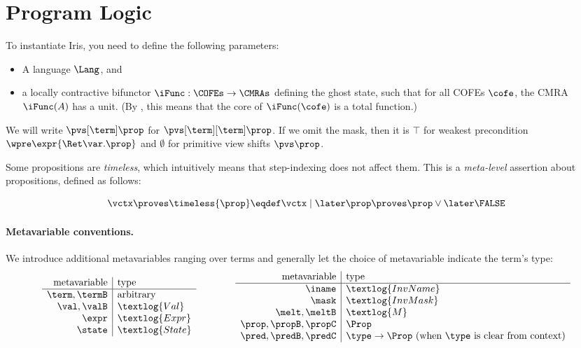 \clearpage
\section{Program Logic}


To instantiate Iris, you need to define the following parameters:
\begin{itemize}
\item A language $\Lang$, and
\item a locally contractive bifunctor $\iFunc : \COFEs \to \CMRAs$ defining the ghost state, such that for all COFEs $\cofe$, the CMRA $\iFunc(A)$ has a unit. (By , this means that the core of $\iFunc(\cofe)$ is a total function.)
\end{itemize}

We will write $\pvs[\term] \prop$ for $\pvs[\term][\term] \prop$.
If we omit the mask, then it is $\top$ for weakest precondition $\wpre\expr{\Ret\var.\prop}$ and $\emptyset$ for primitive view shifts $\pvs \prop$.

Some propositions are \emph{timeless}, which intuitively means that step-indexing does not affect them.
This is a \emph{meta-level} assertion about propositions, defined as follows:

\[ \vctx \proves \timeless{\prop} \eqdef \vctx\mid\later\prop \proves \prop \lor \later\FALSE \]

\paragraph{Metavariable conventions.}
We introduce additional metavariables ranging over terms and generally let the choice of metavariable indicate the term's type:
\[
\begin{array}{r|l}
 \text{metavariable} & \text{type} \\\hline
  \term, \termB & \text{arbitrary} \\
  \val, \valB & \textlog{Val} \\
  \expr & \textlog{Expr} \\
  \state & \textlog{State} \\
\end{array}
\qquad\qquad
\begin{array}{r|l}
 \text{metavariable} & \text{type} \\\hline
  \iname & \textlog{InvName} \\
  \mask & \textlog{InvMask} \\
  \melt, \meltB & \textlog{M} \\
  \prop, \propB, \propC & \Prop \\
  \pred, \predB, \predC & \type\to\Prop \text{ (when $\type$ is clear from context)} \\
\end{array}
\]

